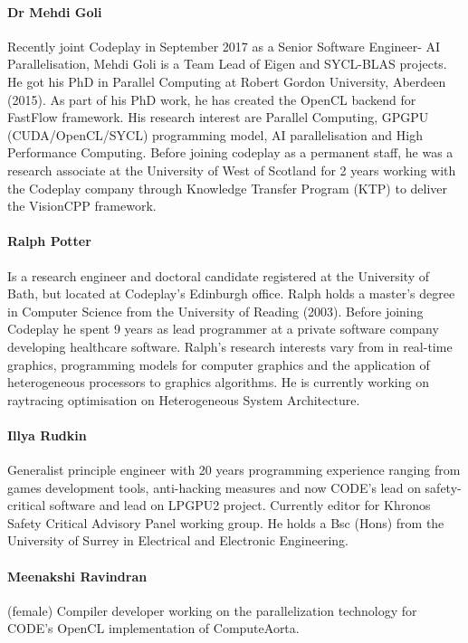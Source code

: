 \documentclass[a4paper,11pt]{article}
\begin{document}
\paragraph{Dr Mehdi Goli} Recently joint Codeplay in September 2017 as a Senior Software Engineer- AI Parallelisation,  Mehdi Goli is a Team Lead of Eigen and SYCL-BLAS projects. He got his PhD in Parallel Computing at Robert Gordon University, Aberdeen (2015). As part of his PhD work, he has created the OpenCL backend for FastFlow framework. His research interest are Parallel Computing,  GPGPU (CUDA/OpenCL/SYCL) programming model, AI parallelisation and  High Performance Computing.  Before joining codeplay as a permanent staff, he was a research associate at the University of West of Scotland for 2 years working with the Codeplay company through Knowledge Transfer Program (KTP) to deliver the VisionCPP  framework.

\paragraph {Ralph Potter} Is a research engineer and doctoral candidate registered at the University of Bath, but located at Codeplay's Edinburgh office. Ralph holds a master's degree in Computer Science from the University of Reading (2003). Before joining Codeplay he spent 9 years as lead programmer at a private software company developing healthcare software. Ralph's research interests vary from in real-time graphics, programming models for computer graphics and the application of heterogeneous processors to graphics algorithms. He is currently working on raytracing optimisation on Heterogeneous System Architecture.

\paragraph{Illya Rudkin} Generalist principle engineer with 20 years programming experience ranging from games development tools, anti-hacking measures and now CODE’s lead on safety-critical software and lead on LPGPU2 project. Currently editor for Khronos Safety Critical Advisory Panel working group. He holds a Bsc (Hons) from the University of Surrey in Electrical and Electronic Engineering.
\paragraph{Meenakshi Ravindran} (female) Compiler developer working on the parallelization technology for CODE’s OpenCL implementation of ComputeAorta. 
\end{document}
